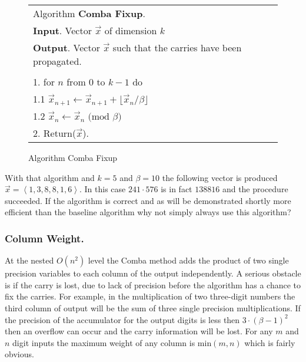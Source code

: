 \documentclass[b5paper]{book}
\begin{document}
\begin{figure}[!here]
\begin{small}
\begin{center}
\begin{tabular}{l}
\hline Algorithm \textbf{Comba Fixup}. \\
\textbf{Input}.   Vector $\vec x$ of dimension $k$ \\
\textbf{Output}.  Vector $\vec x$ such that the carries have been propagated. \\
\hline \\
1.  for $n$ from $0$ to $k - 1$ do \\
\hspace{3mm}1.1 $\vec x_{n+1} \leftarrow \vec x_{n+1} + \lfloor \vec x_{n}/\beta \rfloor$ \\
\hspace{3mm}1.2 $\vec x_{n} \leftarrow \vec x_{n} \mbox{ (mod }\beta\mbox{)}$ \\
2.  Return($\vec x$). \\
\hline
\end{tabular}
\end{center}
\end{small}
\caption{Algorithm Comba Fixup}
\end{figure}

With that algorithm and $k = 5$ and $\beta = 10$ the following vector is produced $\vec x= \left < 1, 3, 8, 8, 1, 6 \right >$.  In this case 
$241 \cdot 576$ is in fact $138816$ and the procedure succeeded.  If the algorithm is correct and as will be demonstrated shortly more
efficient than the baseline algorithm why not simply always use this algorithm?

\subsubsection{Column Weight.}
At the nested $O(n^2)$ level the Comba method adds the product of two single precision variables to each column of the output 
independently.  A serious obstacle is if the carry is lost, due to lack of precision before the algorithm has a chance to fix
the carries.  For example, in the multiplication of two three-digit numbers the third column of output will be the sum of
three single precision multiplications.  If the precision of the accumulator for the output digits is less then $3 \cdot (\beta - 1)^2$ then
an overflow can occur and the carry information will be lost.  For any $m$ and $n$ digit inputs the maximum weight of any column is 
min$(m, n)$ which is fairly obvious.
\end{document}
